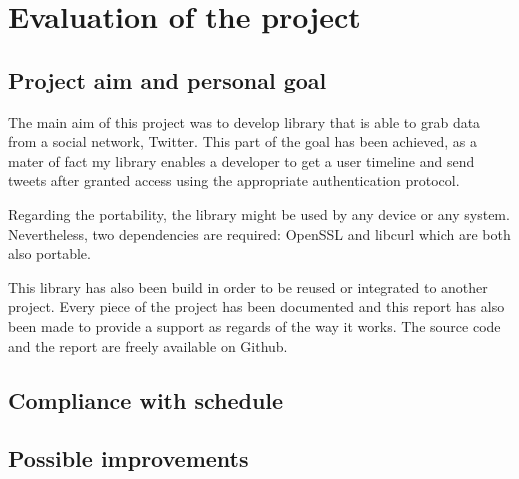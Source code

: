 \chapter{Evaluation of the project}


\section{Project aim and personal goal}


\hspace{15mm}The main aim of this project was to develop library that is able to grab data from a social network, Twitter. This part of the goal has been achieved, as a mater of fact my library enables a developer to get a user timeline and send tweets after granted access using the appropriate authentication protocol.

Regarding the portability, the library might be used by any device or any system. Nevertheless, two dependencies are required: OpenSSL and libcurl which are both also portable.

This library has also been build in order to be reused or integrated to another project. Every piece of the project has been documented and this report has also been made to provide a support as regards of the way it works. The source code and the report are freely available on Github.




\section{Compliance with schedule}



\section{Possible improvements}




\clearpage
